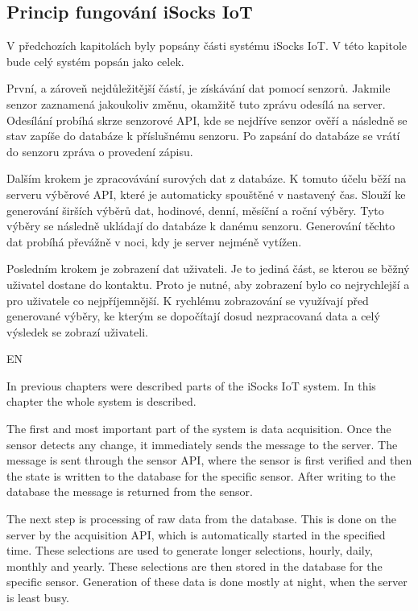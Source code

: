 \documentclass[12pt, a4paper]{article}
\begin{document}
\subsection*{Princip fungování iSocks IoT}
V předchozích kapitolách byly popsány části systému iSocks IoT.
V této kapitole bude celý systém popsán jako celek.

První, a zároveň nejdůležitější částí, je získávání dat pomocí senzorů.
Jakmile senzor zaznamená jakoukoliv změnu, okamžitě tuto zprávu odesílá na server.
Odesílání probíhá skrze senzorové API, kde se nejdříve senzor ověří a následně se stav zapíše do databáze k příslušnému senzoru.
Po zapsání do databáze se vrátí do senzoru zpráva o provedení zápisu.

Dalším krokem je zpracovávání surových dat z databáze.
K tomuto účelu běží na serveru výběrové API, které je automaticky spouštěné v nastavený čas.
Slouží ke generování širších výběrů dat, hodinové, denní, měsíční a roční výběry.
Tyto výběry se následně ukládají do databáze k danému senzoru.
Generování těchto dat probíhá převážně v noci, kdy je server nejméně vytížen.

Posledním krokem je zobrazení dat uživateli.
Je to jediná část, se kterou se běžný uživatel dostane do kontaktu.
Proto je nutné, aby zobrazení bylo co nejrychlejší a pro uživatele co nejpříjemnější.
K rychlému zobrazování se využívají před generované výběry, ke kterým se dopočítají dosud nezpracovaná data a celý výsledek se zobrazí uživateli.

EN

In previous chapters were described parts of the iSocks IoT system.
In this chapter the whole system is described.

The first and most important part of the system is data acquisition.
Once the sensor detects any change, it immediately sends the message to the server.
The message is sent through the sensor API, where the sensor is first verified and then the state is written to the database for the specific sensor.
After writing to the database the message is returned from the sensor.

The next step is processing of raw data from the database.
This is done on the server by the acquisition API, which is automatically started in the specified time.
These selections are used to generate longer selections, hourly, daily, monthly and yearly.
These selections are then stored in the database for the specific sensor.
Generation of these data is done mostly at night, when the server is least busy.
\end{document}
